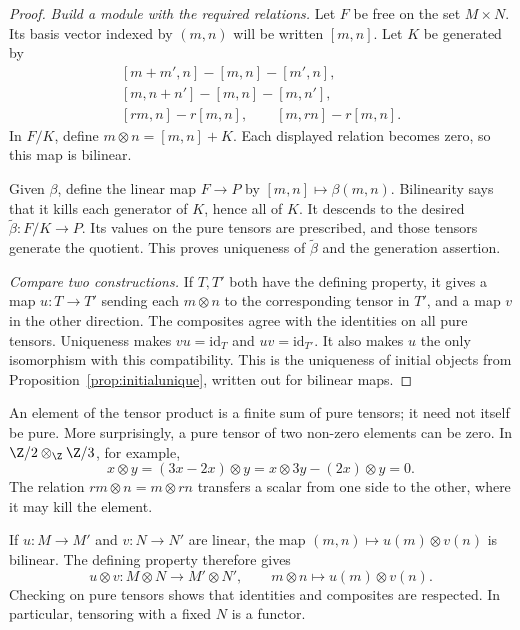 \begin{proof}
\emph{Build a module with the required relations.} Let $F$ be free on the set $M\times N$. Its basis vector indexed by $(m,n)$ will be written $[m,n]$. Let $K$ be generated by
\[
\begin{gathered}
[m+m',n]-[m,n]-[m',n],\\
[m,n+n']-[m,n]-[m,n'],\\
[rm,n]-r[m,n],\qquad [m,rn]-r[m,n].
\end{gathered}
\]
In $F/K$, define $m\otimes n=[m,n]+K$. Each displayed relation becomes zero, so this map is bilinear.

Given $\beta$, define the linear map $F\to P$ by $[m,n]\mapsto\beta(m,n)$. Bilinearity says that it kills each generator of $K$, hence all of $K$. It descends to the desired $\tilde\beta\colon F/K\to P$. Its values on the pure tensors are prescribed, and those tensors generate the quotient. This proves uniqueness of $\tilde\beta$ and the generation assertion.

\emph{Compare two constructions.} If $T,T'$ both have the defining property, it gives a map $u\colon T\to T'$ sending each $m\otimes n$ to the corresponding tensor in $T'$, and a map $v$ in the other direction. The composites agree with the identities on all pure tensors. Uniqueness makes $vu=\mathrm{id}_T$ and $uv=\mathrm{id}_{T'}$. It also makes $u$ the only isomorphism with this compatibility. This is the uniqueness of initial objects from Proposition~\ref{prop:initialunique}, written out for bilinear maps.
\end{proof}

An element of the tensor product is a finite sum of pure tensors; it need not itself be pure. More surprisingly, a pure tensor of two non-zero elements can be zero. In $\Z/2\otimes_\Z\Z/3$, for example,
\[
x\otimes y=(3x-2x)\otimes y
=x\otimes3y-(2x)\otimes y=0.
\]
The relation $rm\otimes n=m\otimes rn$ transfers a scalar from one side to the other, where it may kill the element.

If $u\colon M\to M'$ and $v\colon N\to N'$ are linear, the map $(m,n)\mapsto u(m)\otimes v(n)$ is bilinear. The defining property therefore gives
\[
u\otimes v\colon M\otimes N\to M'\otimes N',\qquad
m\otimes n\mapsto u(m)\otimes v(n).
\]
Checking on pure tensors shows that identities and composites are respected. In particular, tensoring with a fixed $N$ is a functor.

